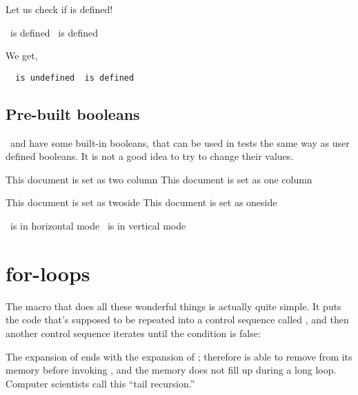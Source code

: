 Let us check if  is defined!

\begin{teX}
\ifthenelse{\isundefined{\isundefined}} 
  {\string\isundefined\ is defined}
  {\string\isundefined\ is defined}
\end{teX}
\medskip

We get,

{\tt
\ifthenelse{\isundefined{\isundefined}} 
  {\string\isundefined\ is undefined}
  {\string\isundefined\ is defined}
}
\medskip



\subsection{Pre-built booleans}
\tex\ and \latex have some built-in booleans, that can be used in
tests the same way as user defined booleans. It is not a good idea
to try to change their values.

\begin{teX}
\ifthenelse{\@twocolumn}
   {This document is set as two column}
   {This document is set as one column}

\ifthenelse{\@twoside}
   {This document is set as twoside}
   {This document is set as oneside}

\ifthenelse{\hmode}
   {\tex\  is in horizontal mode}
   {\tex\  is in vertical mode}
\end{teX}



\section{for-loops}

The  macro that does all these wonderful things is actually quite simple.
It puts the code that's supposed to be repeated into a control sequence called
, and then another control sequence iterates until the condition is false:

\begin{teX}
\def\loop#1\repeat{\def\body{#1}\iterate}
\def\iterate{\body\let\next=\iterate\else\let\next=\relax\fi\next}
\end{teX}



The expansion of  ends with the expansion of ; therefore \tex is able
to remove  from its memory before invoking , and the memory does not
fill up during a long loop. Computer scientists call this ``tail recursion.''

